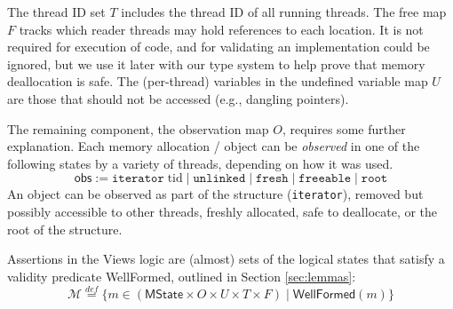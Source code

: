 The thread ID set $T$ includes the thread ID of all running threads.
The free map $F$ tracks which reader threads may hold references to each location. It is not required for execution of code, and for validating an implementation could be ignored, but we use it later with our type system to help prove that memory deallocation is safe.
The (per-thread) variables in the undefined variable map $U$ are those that should not be accessed (e.g., dangling pointers).

The remaining component, the observation map $O$, requires some further explanation.
Each memory allocation / object can be \emph{observed} in one of the following states by a variety of threads, depending on how it was used.
\[\textsf{obs} := \texttt{iterator} \; \mathrm{tid} \mid \texttt{unlinked} \mid \texttt{fresh} \mid \texttt{freeable} \mid \texttt{root}\]
An object can be observed as part of the structure (\texttt{iterator}), removed but possibly accessible to other threads, freshly allocated, safe to deallocate, or the root of the structure.


Assertions in the Views logic are (almost) sets of the logical states that satisfy a validity predicate \textsf{WellFormed}, outlined in Section \ref{sec:lemmas}:
\[\mathcal{M} \stackrel{def}{=} \{ m \in (\textsf{MState} \times O \times U \times T \times F) \mid  \textsf{WellFormed}(m) \} \]


